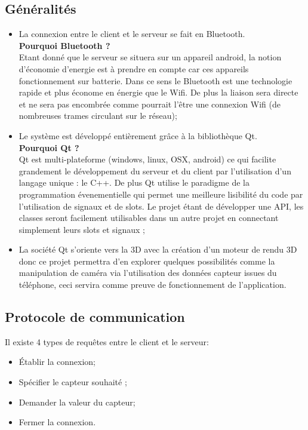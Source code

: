 \subsection{Généralités}

\begin{itemize}
\item  La connexion entre le client et le serveur se fait en Bluetooth. \\
\textbf{Pourquoi Bluetooth ?}\\
Etant donné que le serveur se situera sur un appareil android, la notion d'économie d'energie est à prendre en compte car ces appareils fonctionnement sur batterie. Dans ce sens le Bluetooth est une technologie rapide et plus économe en énergie que le Wifi. De plus la liaison sera directe et ne sera pas encombrée comme pourrait l'être une connexion Wifi (de nombreuses trames circulant sur le réseau);

\item Le système est développé entièrement grâce à la bibliothèque Qt.\\
\textbf{Pourquoi Qt ?}\\
Qt est multi-plateforme (windows, linux, OSX, android) ce qui facilite grandement le développement du serveur et du client par l'utilisation d'un langage unique : le C++. De plus Qt utilise le paradigme de la programmation évenementielle qui permet une meilleure lisibilité du code par l'utilisation de signaux et de slots. Le projet étant de développer une API, les classes seront facilement utilisables dans un autre projet en connectant simplement leurs slots et signaux ;\\

\item La société Qt s'oriente vers la 3D avec la création d'un moteur de rendu 3D donc ce projet permettra d'en explorer quelques possibilités comme la manipulation de caméra via l'utilisation des données capteur issues du téléphone, ceci servira comme preuve de fonctionnement de l'application.\\
\end{itemize}

\subsection{Protocole de communication}
Il existe 4 types de requêtes entre le client et le serveur:
\begin{itemize}
\item Établir la connexion;
\item Spécifier le capteur souhaité ;
\item Demander la valeur du capteur;
\item Fermer la connexion.
\end{itemize}

